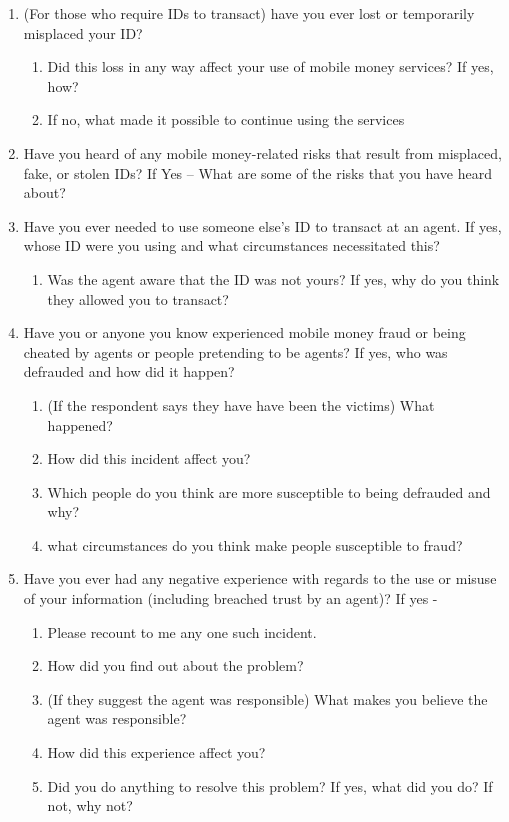 \begin{appendices}
\begin{enumerate}
    \item (For those who require IDs to transact) have you ever lost or temporarily misplaced your ID?
    \begin{enumerate}
        \item Did this loss in any way affect your use of mobile money services? If yes, how?
        \item If no, what made it possible to continue using the services
    \end{enumerate}
    \item Have you heard of any mobile money-related risks that result from misplaced, fake, or stolen IDs?  If Yes – What are some of the risks that you have heard about?
    \item Have you ever needed to use someone else’s ID to transact at an agent. If yes, whose ID were you using and what circumstances necessitated this?
    \begin{enumerate}
        \item Was the agent aware that the ID was not yours? If yes, why do you think they allowed you to transact? 
    \end{enumerate}

    \item Have you or anyone you know experienced mobile money fraud or being cheated by agents or people pretending to be agents? If yes, who was defrauded and how did it happen?
    \begin{enumerate}
        \item (If the respondent says they have have been the victims) What happened?
        \item How did this incident affect you?
        \item Which people do you think are more susceptible to being defrauded and why?
        \item what circumstances do you think make people susceptible to fraud?
    \end{enumerate}

    \item Have you ever had any negative experience with regards to the use or misuse of your information (including breached trust by an agent)? If yes - 
    \begin{enumerate}
        \item Please recount to me any one such incident.
        \item How did you find out about the problem?
        \item (If they suggest the agent was responsible) What makes you believe the agent was responsible?
        \item How did this experience affect you?
        \item Did you do anything to resolve this problem? If yes, what did you do? If not, why not?
    \end{enumerate}
    

\end{enumerate}
\end{appendices}
